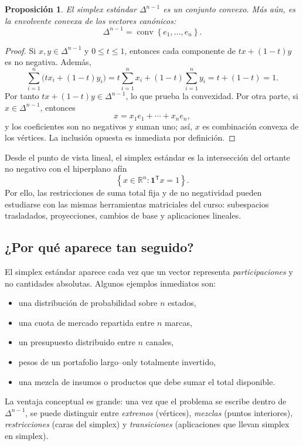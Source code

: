 \documentclass[10pt,a4paper,oneside]{article}
\theoremstyle{plain}
\newtheorem{proposition}[theorem]{Proposición}
\theoremstyle{definition}
\theoremstyle{remark}
\newcommand{\R}{\mathbb{R}}
\newcommand{\set}[1]{\left\{ #1 \right\}}
\begin{document}
\begin{proposition}
El simplex estándar $\Delta^{n-1}$ es un conjunto convexo. Más aún, es la envolvente convexa de los vectores canónicos:
\[
\Delta^{n-1}=\operatorname{conv}\set{e_1,\dots,e_n}.
\]
\end{proposition}

\begin{proof}
Si $x,y\in\Delta^{n-1}$ y $0\le t\le 1$, entonces cada componente de $tx+(1-t)y$ es no negativa. Además,
\[
\sum_{i=1}^n \bigl(tx_i+(1-t)y_i\bigr)=t\sum_{i=1}^n x_i+(1-t)\sum_{i=1}^n y_i=t+(1-t)=1.
\]
Por tanto $tx+(1-t)y\in\Delta^{n-1}$, lo que prueba la convexidad. Por otra parte, si $x\in\Delta^{n-1}$, entonces
\[
x=x_1e_1+\cdots+x_ne_n,
\]
y los coeficientes son no negativos y suman uno; así, $x$ es combinación convexa de los vértices. La inclusión opuesta es inmediata por definición.
\end{proof}

\begin{methodBox}
Desde el punto de vista lineal, el simplex estándar es la intersección del ortante no negativo con el hiperplano afín
\[
\set{x\in\R^n: \mathbf{1}^{\mathsf T}x=1}.
\]
Por ello, las restricciones de suma total fija y de no negatividad pueden estudiarse con las mismas herramientas matriciales del curso: subespacios trasladados, proyecciones, cambios de base y aplicaciones lineales.
\end{methodBox}

\subsection{¿Por qué aparece tan seguido?}

El simplex estándar aparece cada vez que un vector representa \emph{participaciones} y no cantidades absolutas. Algunos ejemplos inmediatos son:
\begin{itemize}
\item una distribución de probabilidad sobre $n$ estados,
\item una cuota de mercado repartida entre $n$ marcas,
\item un presupuesto distribuido entre $n$ canales,
\item pesos de un portafolio largo--only totalmente invertido,
\item una mezcla de insumos o productos que debe sumar el total disponible.
\end{itemize}

La ventaja conceptual es grande: una vez que el problema se escribe dentro de $\Delta^{n-1}$, se puede distinguir entre \emph{extremos} (vértices), \emph{mezclas} (puntos interiores), \emph{restricciones} (caras del simplex) y \emph{transiciones} (aplicaciones que llevan simplex en simplex).
\end{document}

